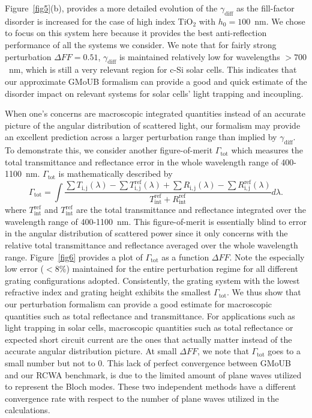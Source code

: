 \documentclass[ floatfix,reprint,amsmath,amssymb,aps,prb]{revtex4-1}
\begin{document}
Figure~\ref{fig5}(b), provides a more detailed evolution of the $\gamma_\mathrm{diff}$ as the fill-factor disorder is increased for the case of high index TiO$_2$ with $h_0 = 100$~nm. We chose to focus on this system here because it provides the best anti-reflection performance of all the systems we consider. We note that for fairly strong perturbation  $\Delta FF=0.51$, $\gamma_\mathrm{diff}$ is maintained relatively low for wavelengths $>700$~nm, which is still a very relevant region for c-Si solar cells. This indicates that our approximate GMoUB formalism can provide a good and quick estimate of the disorder impact on relevant systems for solar cells’ light trapping and incoupling.    


When one's concerns are macroscopic integrated quantities instead of an accurate picture of the angular distribution of scattered light, our formalism may provide an excellent prediction across a larger perturbation range than implied by $\gamma_\mathrm{diff}$. To demonstrate this, we consider another figure-of-merit $\Gamma_\mathrm{tot}$ which measures the total transmittance and reflectance error in the whole wavelength range of 400-1100~nm. $\Gamma_\mathrm{tot}$ is mathematically described by
\begin{equation}
\Gamma_\mathrm{tot}=\int \frac{ \sum T_\mathrm{i,j}(\lambda) -\sum T^{\mathrm{ref}}_\mathrm{i,j}(\lambda)+ \sum R_\mathrm{i,j}(\lambda) - \sum R^{\mathrm{ref}}_\mathrm{i,j}(\lambda)} {T^{\mathrm{ref}}_{\mathrm{int}}+R^{\mathrm{ref}}_{\mathrm{int}}} d\lambda .\label{eq:ErrorInt}
\end{equation}
where $T^{\mathrm{ref}}_{\mathrm{int}}$ and $T^{\mathrm{ref}}_{\mathrm{int}}$ are the total transmittance and reflectance integrated over the wavelength range of 400-1100~nm.
This figure-of-merit is essentially blind to error in the angular distribution of scattered power since it only concerns with the relative total transmittance and reflectance averaged over the whole wavelength range. Figure~\ref{fig6} provides a plot of $\Gamma_\mathrm{tot}$ as a function $\Delta FF$. Note the especially low error ($<8\%$) maintained for the entire perturbation regime for all different grating configurations adopted. Consistently, the grating system with the lowest refractive index and grating height exhibits the smallest $\Gamma_\mathrm{tot}$. We thus show that our perturbation formalism can provide a good estimate for macroscopic quantities such as total reflectance and transmittance. For applications such as light trapping in solar cells, macroscopic quantities such as total reflectance or expected short circuit current are the ones that actually matter instead of the accurate angular distribution picture. At small $\Delta FF$, we note that $\Gamma_\mathrm{tot}$ goes to a small number but not to 0. This lack of perfect convergence between GMoUB and our RCWA benchmark, is due to the limited amount of plane waves utilized to represent the Bloch modes. These two independent methods have a different convergence rate with respect to the number of plane waves utilized in the calculations.  
\end{document}
